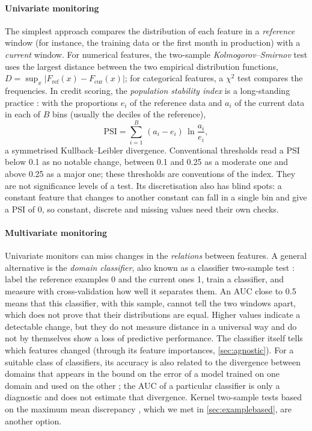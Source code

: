 \paragraph{Univariate monitoring} The simplest approach compares the distribution of each feature in a
\emph{reference} window (for instance, the training data or the first month in production) with a
\emph{current} window. For numerical features, the two-sample \emph{Kolmogorov--Smirnov} test uses the largest
distance between the two empirical distribution functions, $D=\sup_x|F_{\text{ref}}(x)-F_{\text{cur}}(x)|$; for
categorical features, a $\chi^2$ test compares the frequencies. In credit scoring, the \emph{population
stability index} is a long-standing practice \citep{siddiqi2006credit}: with the proportions $e_i$ of the
reference data and $a_i$ of the current data in each of $B$ bins (usually the deciles of the reference),
\begin{equation}\label{eq:psi}
  \mathrm{PSI}=\sum_{i=1}^{B}\,(a_i-e_i)\,\ln\frac{a_i}{e_i},
\end{equation}
a symmetrised Kullback--Leibler divergence. Conventional thresholds read a PSI below 0.1 as no notable
change, between 0.1 and 0.25 as a moderate one and above 0.25 as a major one; these thresholds are conventions of the
index. They are not significance levels of a test. Its discretisation also has blind spots: a constant feature that
changes to another constant can fall in a single bin and give a PSI of 0, so constant, discrete and
missing values need their own checks.

\paragraph{Multivariate monitoring} Univariate monitors can miss changes in the \emph{relations} between
features. A general alternative is the \emph{domain classifier}, also known as a classifier two-sample test
\citep{lopezpaz2017revisiting}: label the reference examples 0 and the current ones 1, train a classifier, and
measure with cross-validation how well it separates them. An AUC close to 0.5 means that this classifier, with this sample,
cannot tell the two windows apart, which does not prove that their distributions are equal. Higher values
indicate a detectable change, but they do not measure distance in a universal way and do not by themselves show a loss of
predictive performance. The classifier itself
tells which features changed (through its feature importances, \cref{sec:agnostic}). For a suitable class of
classifiers, its accuracy is also related to the divergence between domains that appears in the bound on the
error of a model trained on one domain and used on the other \citep{bendavid2010theory}; the AUC of a particular
classifier is only a diagnostic and does not estimate that divergence. Kernel two-sample tests based on the maximum mean discrepancy
\citep{gretton2012kernel}, which we met in \cref{sec:examplebased}, are another option.

